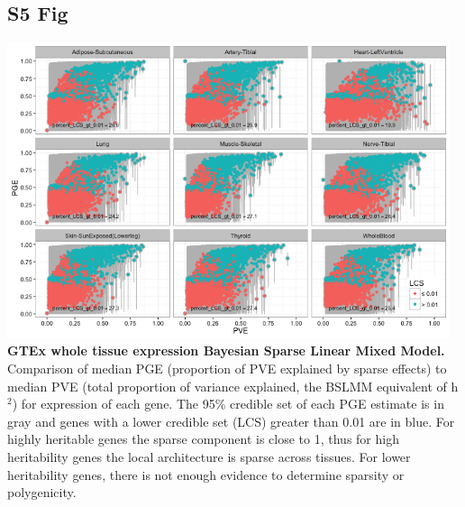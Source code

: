 \documentclass[10pt,letterpaper]{article}
\begin{document}
\begin{singlespace}
\subsection*{S5 Fig}
\includegraphics[width=13cm]{Figures/GenArch_Supp/S4Fig.png}
\label{S5_Fig}
{\bf GTEx whole tissue expression Bayesian Sparse Linear Mixed Model.} Comparison of median PGE (proportion of PVE explained by sparse effects) to median PVE (total proportion of variance explained, the BSLMM equivalent of h$^2$) for expression of each gene. The 95\% credible set of each PGE estimate is in gray and genes with a lower credible set (LCS) greater than 0.01 are in blue. For highly heritable genes the sparse component is close to 1, thus for high heritability genes the local architecture is sparse across tissues. For lower heritability genes, there is not enough evidence to determine sparsity or polygenicity. 


\end{singlespace}
\end{document}
